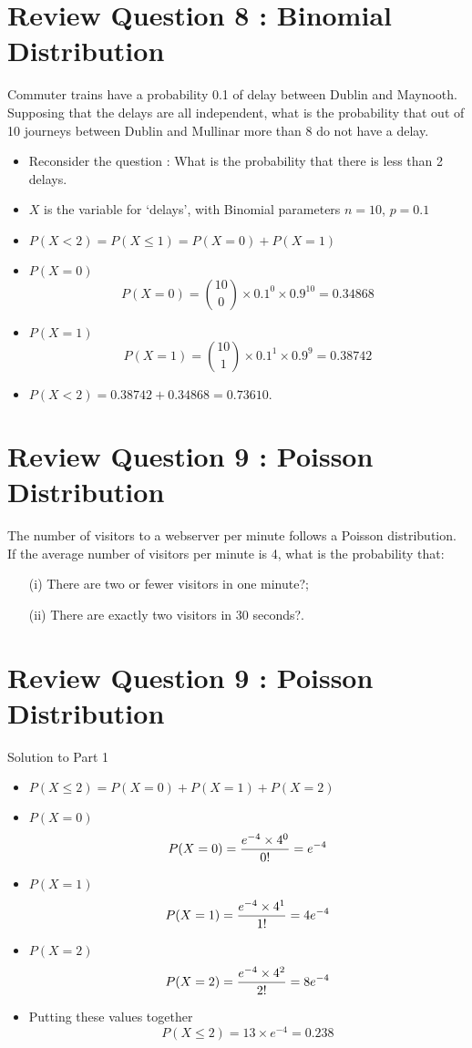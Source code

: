 \documentclass[a4paper,12pt]{article}
\begin{document}
\large 

\section{Review Question 8 :  Binomial Distribution}
Commuter trains have a probability 0.1 of delay
between Dublin and Maynooth. Supposing that the delays are all independent,
what is the probability that out of 10 journeys between Dublin and
Mullinar more than 8 do not have a delay.
\begin{itemize}
\item Reconsider the question : What is the probability that there is less than 2 delays.
\item $X$ is the variable for `delays', with Binomial parameters $n=10$, $p=0.1$
\item $P(X < 2) = P(X \leq 1) = P(X=0)+P(X=1)$
\item $P(X=0)$
\[P(X=0)= {10 \choose 0} \times 0.1^0  \times 0.9^10 = 0.34868\]
\item $P(X=1)$
\[P(X=1)= {10 \choose 1} \times 0.1^1  \times 0.9^9 = 0.38742\]
\item $P(X < 2) = 0.38742 + 0.34868 = 0.73610.$
\end{itemize}


\section{Review Question 9 :  Poisson Distribution}
The number of visitors to a webserver per minute follows a Poisson
distribution. If the average number of visitors per minute is 4,
what is the probability that:
\begin{itemize}
\item[(i)] There are two or fewer visitors in one minute?;
\item[(ii)] There are exactly two visitors in 30 seconds?.
\end{itemize}




\section{Review Question 9 :  Poisson Distribution}
Solution to Part 1
\begin{itemize}
\item $P(X\leq 2) = P(X = 0) + P(X = 1) + P(X = 2)$
\item $P(X = 0)$
 \[P(X = 0) = { e^{-4} \times 4^0\over 0!} = e^{-4}\]
\item $P(X = 1)$
\[P(X = 1) = { e^{-4} \times 4^1\over 1!} = 4e^{-4}\]
\item $P(X = 2)$
\[P(X = 2) = { e^{-4} \times 4^2\over 2!} = 8e^{-4}\]
\item Putting these values together
\[P(X\leq 2) = 13 \times e^{-4} = 0.238\]
\end{itemize}
\end{document}
